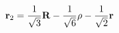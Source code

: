 \begin{equation}                      
{\bf r}_{2} = \frac{1}{\sqrt{3}} {\bf R} - \frac{1}{\sqrt{6}} {\bf \rho}                      
- \frac{1}{\sqrt{2}} {\bf r}                      
\end{equation} 
